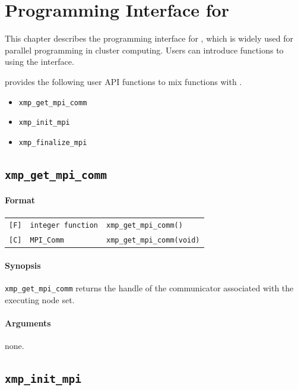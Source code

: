 \chapter{Programming Interface for {\MPI}}

   This chapter describes the programming interface for {\MPI},
   which is widely used for parallel programming in cluster computing.
   Users can introduce {\MPI} functions to {\XMP} using the interface.   

   {\XMP} provides the following user API functions to mix {\MPI}
   functions with {\XMP}.

\begin{itemize}
\item {\tt xmp\_get\_mpi\_comm}
\item {\tt xmp\_init\_mpi}
\item {\tt xmp\_finalize\_mpi}
\end{itemize}

\section{\tt xmp\_get\_mpi\_comm}

\subsubsection*{Format}

\begin{tabular}{lll}
\verb![F]!&  {\tt integer function}& {\tt xmp\_get\_mpi\_comm()}\\
\verb![C]!&  {\tt MPI\_Comm}& {\tt xmp\_get\_mpi\_comm(void)}
\end{tabular}

\subsubsection*{Synopsis}

   {\tt xmp\_get\_mpi\_comm} returns the handle of the communicator
   associated with the executing node set. 

\subsubsection*{Arguments}

none.

\section{\tt xmp\_init\_mpi}

